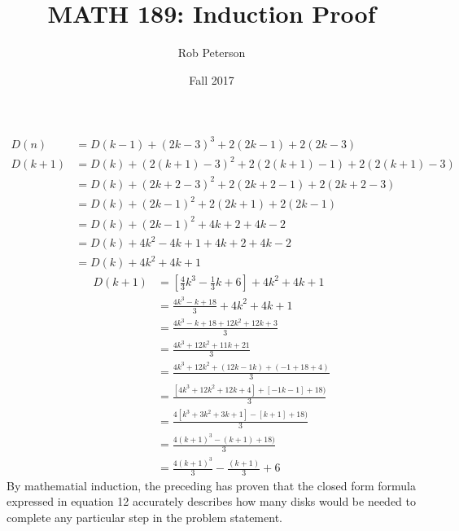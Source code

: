 \documentclass[12pt]{article}
\begin{document}
	\thispagestyle{empty}
	\title{MATH 189: Induction Proof}
	\author{Rob Peterson}
	\date{Fall 2017}
	\maketitle

	\newpage %



	\begin{align}
		D(n)&= D(k-1)+(2k-3)^3+2(2k-1)+2(2k-3)\\
		D(k+1)&=D(k)+(2(k+1)-3)^2+2(2(k+1)-1)+2(2(k+1)-3)\\
		&=D(k)+(2k+2-3)^2+2(2k+2-1)+2(2k+2-3)\\
		&=D(k)+(2k-1)^2+2(2k+1)+2(2k-1)\\
		&=D(k)+(2k-1)^2+4k+2+4k-2\\
		&=D(k)+4k^2-4k+1+4k+2+4k-2\\
		&=D(k)+4k^2+4k+1		
	\end{align}
	\begin{align}
		D(k+1)&=[\frac{4}{3}k^3-\frac{1}{3}k+6]+4k^2+4k+1\\	
		&=\frac{4k^3-k+18}{3}+4k^2+4k+1\\
		&=\frac{4k^3-k+18+12k^2+12k+3}{3}\\
		&=\frac{4k^3+12k^2+11k+21}{3}\\
		&=\frac{4k^3+12k^2+(12k-1k)+(-1+18+4)}{3}\\
		&=\frac{[4k^3+12k^2+12k+4]+[-1k-1]+18)}{3}\\
		&=\frac{4[k^3+3k^2+3k+1]-[k+1]+18)}{3}\\
		&=\frac{4(k+1)^3-(k+1)+18)}{3}\\
		&=\frac{4(k+1)^3}{3}-\frac{(k+1)}{3}+6
	\end{align}
	By mathematial induction, the preceding has proven that the closed form formula expressed in equation 12 accurately describes how many 
	disks would be needed to complete any particular step in the problem statement.
\end{document}
